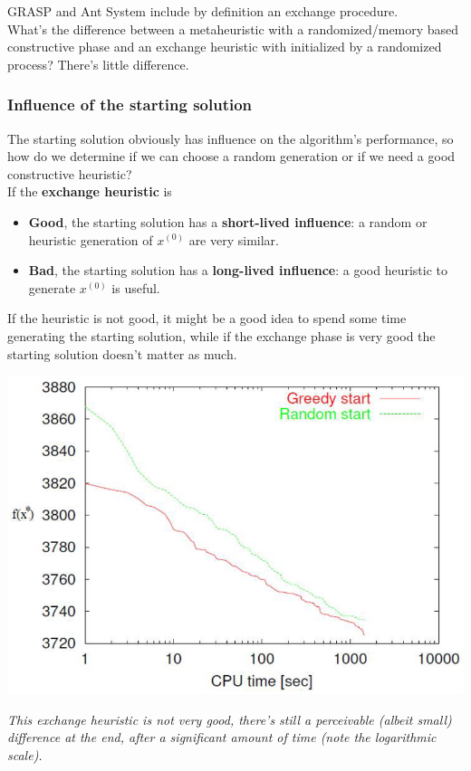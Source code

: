 \documentclass[11pt]{article}
\begin{document}
	GRASP and Ant System include by definition an exchange procedure.\\
	
	What's the difference between a metaheuristic with a randomized/memory based constructive phase and an exchange heuristic with initialized by a randomized process? There's little difference.\\
	
	\newpage
	
	\subsubsection{Influence of the starting solution}
	The starting solution obviously has influence on the algorithm's performance, so how do we determine if we can choose a random generation or if we need a good constructive heuristic?\\
	
	If the \textbf{exchange heuristic} is
	\begin{itemize}
		\item \textbf{Good}, the starting solution has a \textbf{short-lived influence}: a random or heuristic generation of $x^{(0)}$ are very similar.\\
		
		\item \textbf{Bad}, the starting solution has a \textbf{long-lived influence}: a good heuristic to generate $x^{(0)}$ is useful.\\
	\end{itemize}
	If the heuristic is not good, it might be a good idea to spend some time generating the starting solution, while if the exchange phase is very good the starting solution doesn't matter as much.\\
	
	\begin{center}
		\includegraphics[width=0.8\columnwidth]{img/influence1}
	\end{center}
	\textit{This exchange heuristic is not very good, there's still a perceivable (albeit small) difference at the end, after a significant amount of time (note the logarithmic scale).}
	
\end{document}
